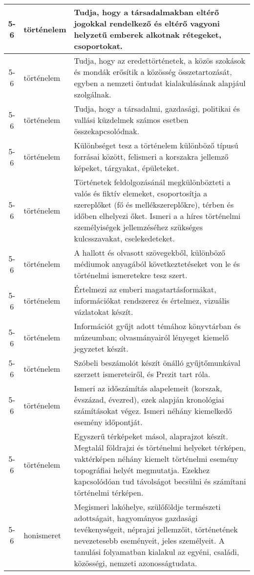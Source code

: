 \begin{small}
\begin{longtable}{c | p{2cm} |  p{11cm} }
              5-6 & történelem & Tudja, hogy a társadalmakban eltérő jogokkal rendelkező és eltérő vagyoni helyzetű emberek alkotnak rétegeket, csoportokat. \\ \hline
              5-6 & történelem & Tudja, hogy az eredettörténetek, a közös szokások és mondák erősítik a közösség összetartozását, egyben a nemzeti öntudat kialakulásának alapjául szolgálnak. \\ \hline
              5-6 & történelem & Tudja, hogy a társadalmi, gazdasági, politikai és vallási küzdelmek számos esetben összekapcsolódnak. \\ \hline
              5-6 & történelem & Különbséget tesz a történelem különböző típusú forrásai között, felismeri a korszakra jellemző képeket, tárgyakat, épületeket. \\ \hline
              5-6 & történelem & Történetek feldolgozásánál megkülönbözteti a valós és fiktív elemeket, csoportosítja a szereplőket (fő és mellékszereplőkre), térben és időben elhelyezi őket. Ismeri a a híres történelmi személyiségek jellemzéséhez szükséges kulcsszavakat, cselekedeteket. \\ \hline
              5-6 & történelem & A hallott és olvasott szövegekből, különböző médiumok anyagából következtetéseket von le és történelmi ismeretekre tesz szert. \\ \hline
              5-6 & történelem & Értelmezi az emberi magatartásformákat, információkat rendszerez és értelmez, vizuális vázlatokat készít. \\ \hline
              5-6 & történelem & Információt gyűjt adott témához könyvtárban és múzeumban; olvasmányairól lényeget kiemelő jegyzetet készít. \\ \hline
              5-6 & történelem & Szóbeli beszámolót készít önálló gyűjtőmunkával szerzett ismereteiről, és Prezit tart róla. \\ \hline
              5-6 & történelem & Ismeri az időszámítás alapelemeit (korszak, évszázad, évezred), ezek alapján kronológiai számításokat végez. Ismeri néhány kiemelkedő esemény időpontját. \\ \hline
              5-6 & történelem & Egyszerű térképeket másol, alaprajzot készít. Megtalál földrajzi és történelmi helyeket térképen, vaktérképen néhány kiemelt történelmi esemény topográfiai helyét megmutatja. Ezekhez kapcsolódóan tud távolságot becsülni és számítani történelmi térképen. \\ \hline
              5-6 & honismeret & Megismeri lakóhelye, szülőföldje természeti adottságait, hagyományos gazdasági tevékenységeit, néprajzi jellemzőit, történetének nevezetesebb eseményeit, jeles személyeit. A tanulási folyamatban kialakul az egyéni, családi, közösségi, nemzeti azonosságtudata. \\ \hline

\end{longtable}
\end{small}

